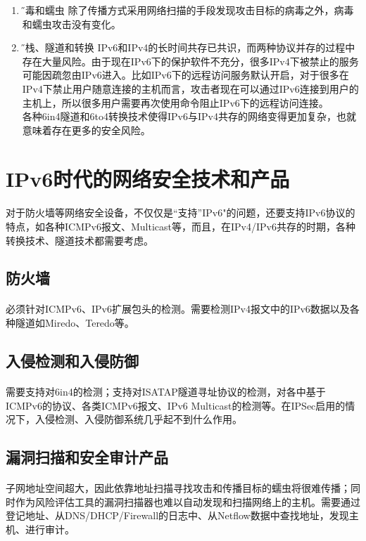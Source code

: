 \documentclass[a4paper,14pt,openany]{article}
\begin{document}
\begin{enumerate}
\item{\H 病毒和蠕虫}
除了传播方式采用网络扫描的手段发现攻击目标的病毒之外，病毒和蠕虫攻击没有变化。

\item{\H 双栈、隧道和转换}
IPv6和IPv4的长时间共存已共识，而两种协议并存的过程中存在大量风险。由于现在IPv6下的保护软件不充分，很多IPv4下被禁止的服务可能因疏忽由IPv6进入。比如IPv6下的远程访问服务默认开启，对于很多在IPv4下禁止用户随意连接的主机而言，攻击者现在可以通过IPv6连接到用户的主机上，所以很多用户需要再次使用命令阻止IPv6下的远程访问连接。
\\
各种6in4隧道和6to4转换技术使得IPv6与IPv4共存的网络变得更加复杂，也就意味着存在更多的安全风险。

\end{enumerate}

\newpage
\section{IPv6时代的网络安全技术和产品}
\paragraph{}
对于防火墙等网络安全设备，不仅仅是“支持”IPv6"的问题，还要支持IPv6协议的特点，如各种ICMPv6报文、Multicast等，而且，在IPv4/IPv6共存的时期，各种转换技术、隧道技术都需要考虑。
\subsection{防火墙}
\paragraph{}
必须针对ICMPv6、IPv6扩展包头的检测。需要检测IPv4报文中的IPv6数据以及各种隧道如Miredo、Teredo等。
\subsection{入侵检测和入侵防御}
\paragraph{}
需要支持对6in4的检测；支持对ISATAP隧道寻址协议的检测，对各中基于ICMPv6的协议、各类ICMPv6报文、IPv6 Multicast的检测等。在IPSec启用的情况下，入侵检测、入侵防御系统几乎起不到什么作用。
\subsection{漏洞扫描和安全审计产品}
\paragraph{}
子网地址空间超大，因此依靠地址扫描寻找攻击和传播目标的蠕虫将很难传播；同时作为风险评估工具的漏洞扫描器也难以自动发现和扫描网络上的主机。需要通过登记地址、从DNS/DHCP/Firewall的日志中、从Netflow数据中查找地址，发现主机、进行审计。
\end{document}
